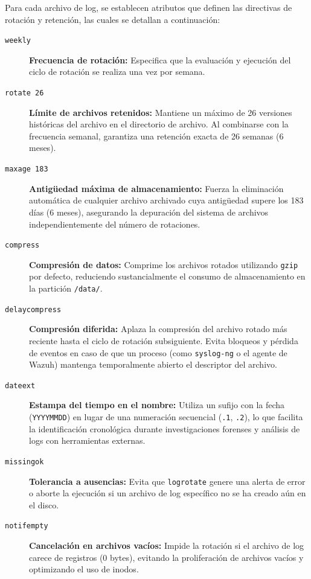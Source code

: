 Para cada archivo de log, se establecen atributos que definen las directivas de rotación y retención, las cuales se detallan a continuación:

\begin{description}
    \item[\texttt{weekly}] \textbf{Frecuencia de rotación:} Especifica que la evaluación y ejecución del ciclo de rotación se realiza una vez por semana.

    \item[\texttt{rotate 26}] \textbf{Límite de archivos retenidos:} Mantiene un máximo de 26 versiones históricas del archivo en el directorio de archivo. Al combinarse con la frecuencia semanal, garantiza una retención exacta de 26 semanas (6 meses).

    \item[\texttt{maxage 183}] \textbf{Antigüedad máxima de almacenamiento:} Fuerza la eliminación automática de cualquier archivo archivado cuya antigüedad supere los 183 días (6 meses), asegurando la depuración del sistema de archivos independientemente del número de rotaciones.

    \item[\texttt{compress}] \textbf{Compresión de datos:} Comprime los archivos rotados utilizando \texttt{gzip} por defecto, reduciendo sustancialmente el consumo de almacenamiento en la partición \texttt{/data/}.

    \item[\texttt{delaycompress}] \textbf{Compresión diferida:} Aplaza la compresión del archivo rotado más reciente hasta el ciclo de rotación subsiguiente. Evita bloqueos y pérdida de eventos en caso de que un proceso (como \texttt{syslog-ng} o el agente de Wazuh) mantenga temporalmente abierto el descriptor del archivo.

    \item[\texttt{dateext}] \textbf{Estampa del tiempo en el nombre:} Utiliza un sufijo con la fecha (\texttt{YYYYMMDD}) en lugar de una numeración secuencial (\texttt{.1}, \texttt{.2}), lo que facilita la identificación cronológica durante investigaciones forenses y análisis de logs con herramientas externas.

    \item[\texttt{missingok}] \textbf{Tolerancia a ausencias:} Evita que \texttt{logrotate} genere una alerta de error o aborte la ejecución si un archivo de log específico no se ha creado aún en el disco.

    \item[\texttt{notifempty}] \textbf{Cancelación en archivos vacíos:} Impide la rotación si el archivo de log carece de registros (0 bytes), evitando la proliferación de archivos vacíos y optimizando el uso de inodos.


\end{description}
